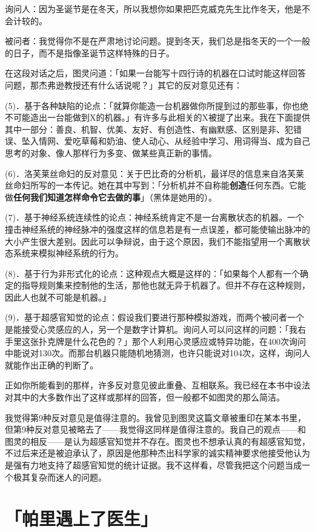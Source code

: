 \documentclass[
  12pt,
  twoside,
  openright,
  oldfontcommands,
]{memoir}
\newcommand{\heititext}[1]{{\heifamily\bfseries #1}}
\begin{document}
询问人：因为圣诞节是在冬天，所以我想你如果把匹克威克先生比作冬天，他是不会计较的。

被问者：我觉得你不是在严肃地讨论问题。提到冬天，我们总是指冬天的一个一般的日子，而不是指像圣诞节这样特殊的日子。

在这段对话之后，图灵问道：「如果一台能写十四行诗的机器在口试时能这样回答问题，那杰弗逊教授还有什么话说呢？」其它的反对意见还有：

(5)．基于各种缺陷的论点：「就算你能造一台机器做你所提到过的那些事，你也绝不可能造出一台能做到X的机器。」有许多与此相关的X被提了出来。我在下面提供其中一部分：善良、机智、优美、友好、有创造性、有幽默感、区别是非、犯错误、坠入情网、爱吃草莓和奶油、使人动心、从经验中学习、用词得当、成为自己思考的对象、像人那样行为多变、做某些真正新的事情。

(6)．洛芙莱丝命妇的反对意见：关于巴比奇的分析机，最详尽的信息来自洛芙莱丝命妇所写的一本传记。她在其中写到：「分析机并不自称能\heititext{创造}任何东西。它能做\heititext{任何我们知道怎样命令它去做的事}」（黑体是她用的）。

(7)．基于神经系统连续性的论点：神经系统肯定不是一台离散状态的机器。一个撞击神经系统的神经脉冲的强度这样的信息若是有一点误差，都可能使输出脉冲的大小产生很大差别。因此可以争辩说，由于这个原因，我们不能指望用一个离散状态系统来模拟神经系统的行为。

(8)．基于行为非形式化的论点：这种观点大概是这样的：「如果每个人都有一个确定的指导规则集来控制他的生活，那他也就无异于机器了。但并不存在这种规则，因此人也就不可能是机器。」

(9)．基于超感官知觉的论点：假设我们要进行那种模拟游戏，而两个被问者一个是能接受心灵感应的人，另一个是数字计算机。询问人可以问这样的问题：「我右手里这张扑克牌是什么花色的？」那个人利用心灵感应或特异功能，在400次询问中能说对130次。而那台机器只能随机地猜测，也许只能说对104次，这样，询问人就能作出正确的判断了。

正如你所能看到的那样，许多反对意见彼此重叠、互相联系。我已经在本书中设法对其中的大多数作出了这样或那样的回答，但一般都不如图灵的那么简洁。

我觉得第9种反对意见是值得注意的。我曾见到图灵这篇文章被重印在某本书里，但第9种反对意见被略去了------我觉得这同样是值得注意的。我自己的观点------和图灵的相反------是认为超感官知觉并不存在。图灵也不想承认真的有超感官知觉，不过后来还是被迫承认了，原因是他那种杰出科学家的诚实精神要求他接受他认为是强有力地支持了超感官知觉的统计证据。我不这样看，尽管我把这个问题当成一个极其复杂而迷人的问题。

\section{「帕里遇上了医生」}
\end{document}
